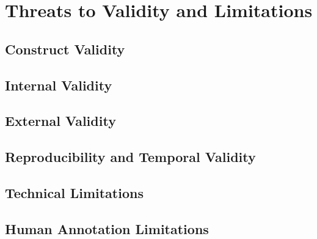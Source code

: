 \chapter{Threats to Validity and Limitations}
\label{ch:limitations}
\section{Construct Validity}
\mbox{}\par
\section{Internal Validity}
\mbox{}\par
\section{External Validity}
\mbox{}\par
\section{Reproducibility and Temporal Validity}
\mbox{}\par
\section{Technical Limitations}
\mbox{}\par
\section{Human Annotation Limitations}
\mbox{}\par
